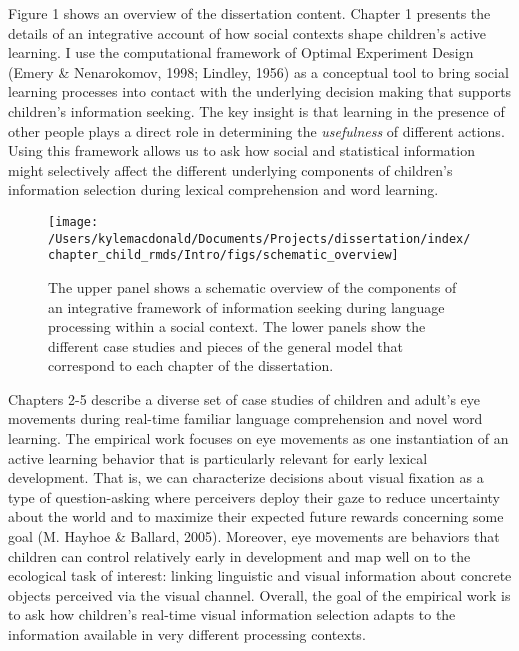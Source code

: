 \documentclass[oneside]{report}
\begin{document}
Figure 1 shows an overview of the dissertation content. Chapter 1
presents the details of an integrative account of how social contexts
shape children's active learning. I use the computational framework of
Optimal Experiment Design (Emery \& Nenarokomov, 1998; Lindley, 1956) as
a conceptual tool to bring social learning processes into contact with
the underlying decision making that supports children's information
seeking. The key insight is that learning in the presence of other
people plays a direct role in determining the \emph{usefulness} of
different actions. Using this framework allows us to ask how social and
statistical information might selectively affect the different
underlying components of children's information selection during lexical
comprehension and word learning.
\begin{figure}[!t]

{\centering \texttt{[image: /Users/kylemacdonald/Documents/Projects/dissertation/index/chapter\_child\_rmds/Intro/figs/schematic\_overview]} 

}

\caption[Schematic overview of the dissertation content.]{The upper panel shows a schematic overview of the components of an integrative framework of information seeking during language processing within a social context. The lower panels show the different case studies and pieces of the general model that correspond to each chapter of the dissertation.}\label{fig:schematic-overview}
\end{figure}
Chapters 2-5 describe a diverse set of case studies of children and
adult's eye movements during real-time familiar language comprehension
and novel word learning. The empirical work focuses on eye movements as
one instantiation of an active learning behavior that is particularly
relevant for early lexical development. That is, we can characterize
decisions about visual fixation as a type of question-asking where
perceivers deploy their gaze to reduce uncertainty about the world and
to maximize their expected future rewards concerning some goal (M.
Hayhoe \& Ballard, 2005). Moreover, eye movements are behaviors that
children can control relatively early in development and map well on to
the ecological task of interest: linking linguistic and visual
information about concrete objects perceived via the visual channel.
Overall, the goal of the empirical work is to ask how children's
real-time visual information selection adapts to the information
available in very different processing contexts.
\end{document}
